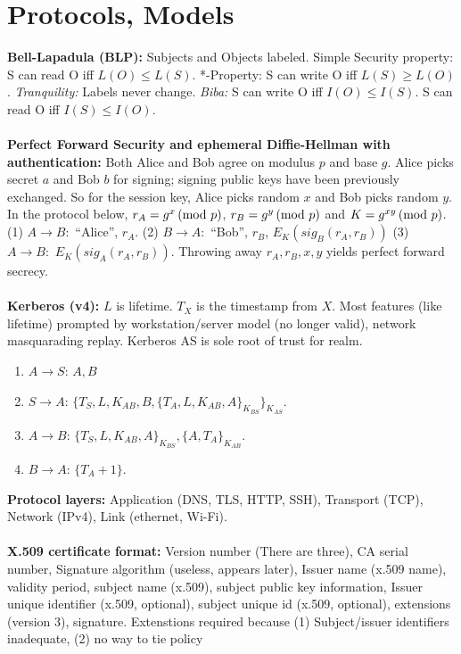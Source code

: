 \section{Protocols, Models}
{\bf Bell-Lapadula (BLP):}  Subjects and Objects labeled.  Simple Security property:
S can read O iff $L(O) \leq L(S)$.  *-Property: S can write O iff $L(S) \geq L(O)$.
\emph{Tranquility:} Labels never change.  \emph{Biba:} S can write O iff $I(O) \leq I(S)$.  S can
read O iff $I(S) \leq I(O)$.
\\
\\
{\bf Perfect Forward Security and ephemeral Diffie-Hellman with authentication:}
Both Alice and Bob agree on modulus $p$ and base $g$.  Alice picks secret
$a$ and Bob $b$ for signing; signing public keys have been previously exchanged.
So for the session key, Alice picks random $x$ and Bob picks random $y$.
In the protocol below, $r_A= g^x \thinspace \textnormal{(mod } p \textnormal{)}$,
$r_B= g^y \thinspace \textnormal{(mod } p \textnormal{)}$ and $K= g^{xy} \thinspace \textnormal{(mod } p \textnormal{)}$.  
(1) $A \rightarrow B:$ ``Alice'', $r_A$.
(2) $B \rightarrow A:$ ``Bob'', $r_B$, $E_K(sig_B(r_A, r_B))$
(3) $A \rightarrow B:$ $E_K(sig_A(r_A, r_B))$.  Throwing away $r_A, r_B, x, y$ 
yields perfect forward secrecy.
\\
\\
{\bf Kerberos (v4):} $L$ is lifetime. $T_X$ is the timestamp from $X$. Most features (like lifetime)
prompted by workstation/server model (no longer valid), network masquarading replay.  Kerberos AS
is sole root of trust for realm.
\begin{enumerate}
\item $A \rightarrow S$: $A,B$
\item $S \rightarrow A$: $\{T_S , L, K_{AB}, B, \{T_A, L, K_{AB},A\}_{K_{BS}}\}_{K_{AS}}$.
\item $A \rightarrow B$: $\{T_S , L, K_{AB}, A\}_{K_{BS}}, \{A, T_A\}_{K_{AB}}$.
\item $B \rightarrow A$: $\{T_A +1\}$.
\end{enumerate}
{\bf Protocol layers:} Application (DNS, TLS, HTTP, SSH), Transport (TCP), Network (IPv4),
Link (ethernet, Wi-Fi).
\\
\\
{\bf X.509 certificate format:} Version number (There are three), CA serial number,
Signature algorithm (useless, appears later), Issuer name (x.509 name), validity period,
subject name (x.509), subject public key information, 
Issuer unique identifier (x.509, optional),
subject unique id (x.509, optional), extensions (version 3), signature.  
Extenstions required because 
(1) Subject/issuer identifiers inadequate, (2) no way to tie policy
